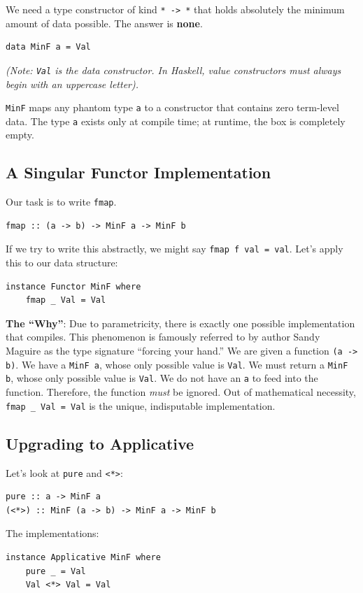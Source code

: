 \documentclass[12pt,a4paper]{article}
\begin{document}
We need a type constructor of kind \texttt{* -> *} that holds absolutely the minimum amount of data possible. The answer is \textbf{none}.
\begin{lstlisting}
data MinF a = Val
\end{lstlisting}
\textit{(Note: \texttt{Val} is the data constructor. In Haskell, value constructors must always begin with an uppercase letter).}

\texttt{MinF} maps any phantom type \texttt{a} to a constructor that contains zero term-level data. The type \texttt{a} exists only at compile time; at runtime, the box is completely empty.

\subsection{A Singular Functor Implementation}

Our task is to write \texttt{fmap}.
\begin{lstlisting}
fmap :: (a -> b) -> MinF a -> MinF b
\end{lstlisting}
If we try to write this abstractly, we might say \texttt{fmap f val = val}.
Let's apply this to our data structure:
\begin{lstlisting}
instance Functor MinF where
    fmap _ Val = Val
\end{lstlisting}

\textbf{The ``Why''}: Due to parametricity, there is exactly one possible implementation that compiles. This phenomenon is famously referred to by author Sandy Maguire as the type signature ``forcing your hand.'' We are given a function \texttt{(a -> b)}. We have a \texttt{MinF a}, whose only possible value is \texttt{Val}. We must return a \texttt{MinF b}, whose only possible value is \texttt{Val}. We do not have an \texttt{a} to feed into the function. Therefore, the function \textit{must} be ignored. Out of mathematical necessity, \texttt{fmap \_ Val = Val} is the unique, indisputable implementation.

\subsection{Upgrading to Applicative}

Let's look at \texttt{pure} and \texttt{<*>}:
\begin{lstlisting}
pure :: a -> MinF a
(<*>) :: MinF (a -> b) -> MinF a -> MinF b
\end{lstlisting}

The implementations:
\begin{lstlisting}
instance Applicative MinF where
    pure _ = Val
    Val <*> Val = Val
\end{lstlisting}
\end{document}
